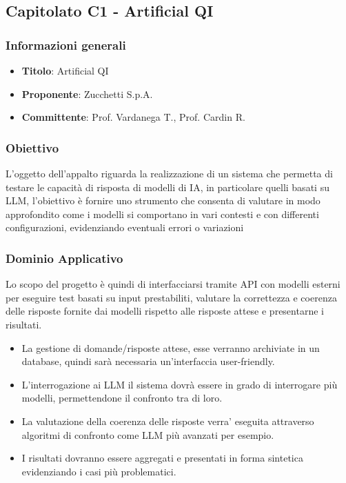 \subsection{Capitolato C1 - Artificial QI}
    \subsubsection{Informazioni generali}
        \begin{itemize}
            \item \textbf{Titolo}: Artificial QI
            \item \textbf{Proponente}: Zucchetti S.p.A.
            \item \textbf{Committente}: Prof. Vardanega T., Prof. Cardin R.
        \end{itemize}
     \subsubsection{Obiettivo}
    L’oggetto dell’appalto riguarda la realizzazione di un sistema che permetta di testare le capacità di risposta di modelli di IA, in particolare quelli basati su LLM, l’obiettivo è fornire uno strumento che consenta di valutare in modo approfondito come i modelli si comportano in vari contesti e con differenti configurazioni, evidenziando eventuali errori o variazioni

     \subsubsection{Dominio Applicativo}
    Lo scopo del progetto è quindi di interfacciarsi tramite API con modelli esterni per eseguire test basati su input prestabiliti, valutare la correttezza e coerenza delle risposte fornite dai modelli rispetto alle risposte attese e presentarne i risultati.
\begin{itemize}
    \item  La gestione di domande/risposte attese, esse verranno archiviate in un database, quindi sarà necessaria un’interfaccia user-friendly.
    \item  L’interrogazione ai LLM il sistema dovrà essere in grado di interrogare più modelli, permettendone il confronto tra di loro.
    \item  La valutazione della coerenza delle risposte verra’ eseguita attraverso algoritmi di confronto come LLM più avanzati per esempio.
    \item I risultati dovranno essere aggregati e presentati in forma sintetica evidenziando i casi più problematici.
\end{itemize}
